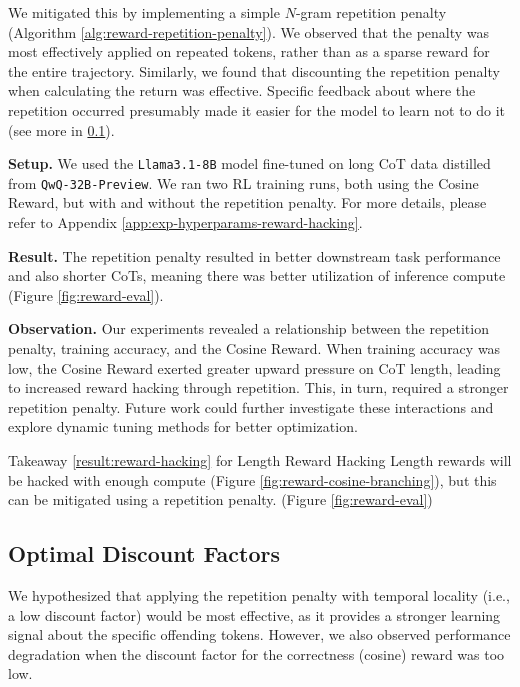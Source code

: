 We mitigated this by implementing a simple $N$-gram repetition penalty (Algorithm \ref{alg:reward-repetition-penalty}). We observed that the penalty was most effectively applied on repeated tokens, rather than as a sparse reward for the entire trajectory. Similarly, we found that discounting the repetition penalty when calculating the return was effective. Specific feedback about where the repetition occurred presumably made it easier for the model to learn not to do it (see more in \textsection\ref{result:optimal-discount}).

\noindent\textbf{Setup.} We used the \texttt{Llama3.1-8B} model fine-tuned on long CoT data distilled from \texttt{QwQ-32B-Preview}. We ran two RL training runs, both using the Cosine Reward, but with and without the repetition penalty. For more details, please refer to Appendix \ref{app:exp-hyperparams-reward-hacking}.

\noindent\textbf{Result.} The repetition penalty resulted in better downstream task performance and also shorter CoTs, meaning there was better utilization of inference compute (Figure \ref{fig:reward-eval}).

\textbf{Observation.} Our experiments revealed a relationship between the repetition penalty, training accuracy, and the Cosine Reward. When training accuracy was low, the Cosine Reward exerted greater upward pressure on CoT length, leading to increased reward hacking through repetition. This, in turn, required a stronger repetition penalty. Future work could further investigate these interactions and explore dynamic tuning methods for better optimization.

\begin{AIbox}{Takeaway \hypersetup{hidelinks}\ref{result:reward-hacking} for Length Reward Hacking}
Length rewards will be hacked with enough compute (Figure \ref{fig:reward-cosine-branching}), but this can be mitigated using a repetition penalty. (Figure \ref{fig:reward-eval})
\end{AIbox}

\subsection{Optimal Discount Factors}
\label{result:optimal-discount}

We hypothesized that applying the repetition penalty with temporal locality (i.e., a low discount factor) would be most effective, as it provides a stronger learning signal about the specific offending tokens. However, we also observed performance degradation when the discount factor for the correctness (cosine) reward was too low.

